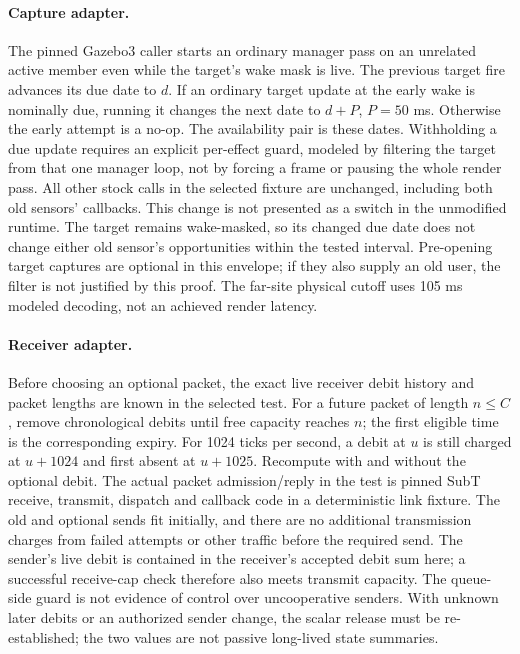 \documentclass{article}
\begin{document}
\paragraph{Capture adapter.}
The pinned Gazebo3 caller starts an ordinary manager pass on an
unrelated active member even while the target's wake mask is live.
The previous target fire advances its due date to \(d\).
If an ordinary target update at the early wake is nominally due,
running it changes the next date to \(d+P\), \(P=50\) ms.
Otherwise the early attempt is a no-op. The availability pair
is these dates. Withholding a due update requires an explicit
per-effect guard, modeled by filtering the target from that
one manager loop, not by forcing a frame or pausing the whole
render pass. All other stock calls in the selected fixture are
unchanged, including both old sensors' callbacks. This change
is not presented as a switch in the unmodified runtime.
The target remains wake-masked, so its changed due date does not
change either old sensor's opportunities within the tested interval.
Pre-opening target captures are optional in this envelope; if they
also supply an old user, the filter is not justified by this proof.
The far-site physical cutoff uses 105 ms modeled decoding, not
an achieved render latency.

\paragraph{Receiver adapter.}
Before choosing an optional packet, the exact live receiver debit
history and packet lengths are known in the selected test. For a
future packet of length \(n\leq C\), remove chronological debits
until free capacity reaches \(n\); the first eligible time is
the corresponding expiry. For 1024 ticks per second, a debit
at \(u\) is still charged at \(u+1024\) and first absent at
\(u+1025\). Recompute with and without the optional debit.
The actual packet admission/reply in the test is pinned SubT
receive, transmit, dispatch and callback code in a deterministic
link fixture. The old and optional sends fit initially, and
there are no additional transmission charges from failed attempts
or other traffic before the required send. The sender's live
debit is contained in the receiver's accepted debit sum here;
a successful receive-cap check therefore also meets transmit
capacity. The queue-side guard is not evidence of control over
uncooperative senders. With unknown later debits or an authorized
sender change, the scalar release must be re-established; the
two values are not passive long-lived state summaries.
\end{document}
